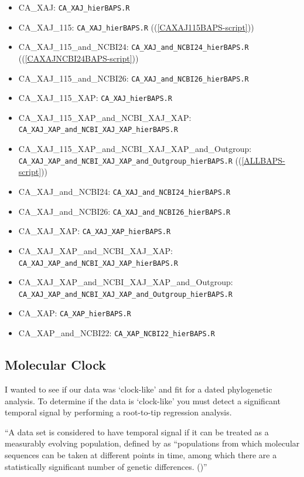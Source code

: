 \documentclass[
]{book}
\providecommand{\tightlist}{%
  \setlength{\itemsep}{0pt}\setlength{\parskip}{0pt}}
\begin{document}
\begin{itemize}
\tightlist
\item
  CA\_XAJ: \texttt{CA\_XAJ\_hierBAPS.R}
\item
  CA\_XAJ\_115: \texttt{CA\_XAJ\_hierBAPS.R} ((\ref{CAXAJ115BAPS-script}))
\item
  CA\_XAJ\_115\_and\_NCBI24: \texttt{CA\_XAJ\_and\_NCBI24\_hierBAPS.R} ((\ref{CAXAJNCBI24BAPS-script}))
\item
  CA\_XAJ\_115\_and\_NCBI26: \texttt{CA\_XAJ\_and\_NCBI26\_hierBAPS.R}
\item
  CA\_XAJ\_115\_XAP: \texttt{CA\_XAJ\_hierBAPS.R}
\item
  CA\_XAJ\_115\_XAP\_and\_NCBI\_XAJ\_XAP: \texttt{CA\_XAJ\_XAP\_and\_NCBI\_XAJ\_XAP\_hierBAPS.R}
\item
  CA\_XAJ\_115\_XAP\_and\_NCBI\_XAJ\_XAP\_and\_Outgroup: \texttt{CA\_XAJ\_XAP\_and\_NCBI\_XAJ\_XAP\_and\_Outgroup\_hierBAPS.R} ((\ref{ALLBAPS-script}))
\item
  CA\_XAJ\_and\_NCBI24: \texttt{CA\_XAJ\_and\_NCBI24\_hierBAPS.R}
\item
  CA\_XAJ\_and\_NCBI26: \texttt{CA\_XAJ\_and\_NCBI26\_hierBAPS.R}
\item
  CA\_XAJ\_XAP: \texttt{CA\_XAJ\_XAP\_hierBAPS.R}
\item
  CA\_XAJ\_XAP\_and\_NCBI\_XAJ\_XAP: \texttt{CA\_XAJ\_XAP\_and\_NCBI\_XAJ\_XAP\_hierBAPS.R}
\item
  CA\_XAJ\_XAP\_and\_NCBI\_XAJ\_XAP\_and\_Outgroup: \texttt{CA\_XAJ\_XAP\_and\_NCBI\_XAJ\_XAP\_and\_Outgroup\_hierBAPS.R}
\item
  CA\_XAP: \texttt{CA\_XAP\_hierBAPS.R}
\item
  CA\_XAP\_and\_NCBI22: \texttt{CA\_XAP\_NCBI22\_hierBAPS.R}
\end{itemize}

\subsection{Molecular Clock}\label{molecular-clock}

I wanted to see if our data was `clock-like' and fit for a dated phylogenetic analysis. To determine if the data is `clock-like' you must detect a significant temporal signal by performing a root-to-tip regression analysis.

``A data set is considered to have temporal signal if it can be treated as a measurably evolving population, defined by \citet{Drummond2003} as ``populations from which molecular sequences can be taken at different points in time, among which there are a statistically significant number of genetic differences. (\citet{Duchene2020})''
\end{document}
